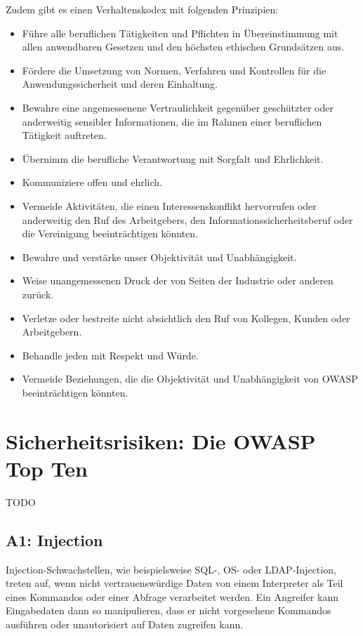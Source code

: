 \documentclass[12pt,oneside,a4paper,parskip]{scrbook}
\begin{document}
Zudem gibt es einen Verhaltenskodex mit folgenden Prinzipien:
\begin{itemize}
  \item Führe alle beruflichen Tätigkeiten und Pflichten in Übereinstimmung mit allen anwendbaren Gesetzen und den höchsten ethischen Grundsätzen aus.
  \item Fördere die Umsetzung von Normen, Verfahren und Kontrollen für die Anwendungssicherheit und deren Einhaltung.
  \item Bewahre eine angemessenene Vertraulichkeit gegenüber geschützter oder anderweitig sensibler Informationen, die im Rahmen einer beruflichen Tätigkeit auftreten.
  \item Übernimm die berufliche Verantwortung mit Sorgfalt und Ehrlichkeit.
  \item Kommuniziere offen und ehrlich.
  \item Vermeide Aktivitäten, die einen Interessenskonflikt hervorrufen oder anderweitig den Ruf des Arbeitgebers, den Informationssicherheitsberuf oder die Vereinigung beeinträchtigen könnten.
  \item Bewahre und verstärke unser Objektivität und Unabhängigkeit.
  \item Weise unangemessenen Druck der von Seiten der Industrie oder anderen zurück.
  \item Verletze oder bestreite nicht absichtlich den Ruf von Kollegen, Kunden oder Arbeitgebern.
  \item Behandle jeden mit Respekt und Würde.
  \item Vermeide Beziehungen, die die Objektivität und Unabhängigkeit von OWASP  beeinträchtigen könnten.
\end{itemize}

\cite{OWASPabout}

\section{Sicherheitsrisiken: Die OWASP Top Ten}
TODO
\cite{OWASPtop10}

\subsection{A1: Injection}
Injection-Schwachstellen, wie beispielsweise SQL-, OS- oder LDAP-Injection, treten auf, wenn
nicht vertrauenswürdige Daten von einem Interpreter als Teil eines Kommandos oder einer
Abfrage verarbeitet werden. Ein Angreifer kann Eingabedaten dann so manipulieren, dass er nicht
vorgesehene Kommandos ausführen oder unautorisiert auf Daten zugreifen kann.
\end{document}
